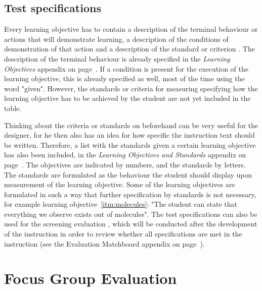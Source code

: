 \documentclass[11pt,twoside]{report} %
\begin{document}
\section{Test specifications}
\label{subch:testspecifications}

Every learning objective has to contain a description of the terminal behaviour or actions that will demonstrate learning, a description of the conditions of demonstration of that action and a description of the standard or criterion \cite{smithragan}. The description of the terminal behaviour is already specified in the \emph{Learning Objectives} appendix on page~\pageref{app:learningobjectives}. If a condition is present for the execution of the learning objective, this is already specified as well, most of the time using the word "given". However, the standards or criteria for measuring specifying how the learning objective has to be achieved by the student are not yet included in the table.

Thinking about the criteria or standards on beforehand can be very useful for the designer, for he then also has an idea for how specific the instruction text should be written. Therefore, a list with the standards given a certain learning objective has also been included, in the \emph{Learning Objectives and Standards} appendix on page~\pageref{app:objectivestandards}. The objectives are indicated by numbers, and the standards by letters. The standards are formulated as the behaviour the student should display upon measurement of the learning objective. Some of the learning objectives are formulated in such a way that further specification by standards is not necessary, for example learning objective~\ref{itm:molecules}: "The student can state that everything we observe exists out of molecules". The test specifications can also be used for the screening evaluation \cite{evamatchboard}, which will be conducted after the development of the instruction in order to review whether all specifications are met in the instruction (see the Evaluation Matchboard appendix on page~\pageref{app:evamatchboard}).

\chapter{Focus Group Evaluation}
\label{ch:focusgroup}
\end{document}
